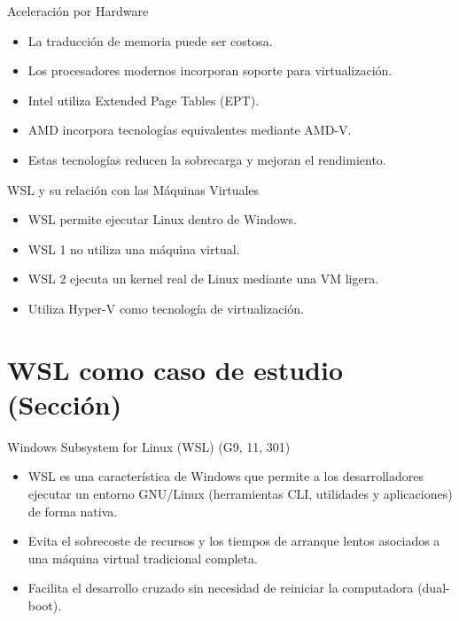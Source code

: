 \documentclass[presentation]{beamer}
\begin{document}
\begin{frame}[label={sec:org21f7b8d}]{Aceleración por Hardware}
\begin{itemize}
\item La traducción de memoria puede ser costosa.
\item Los procesadores modernos incorporan soporte para virtualización.
\item Intel utiliza Extended Page Tables (EPT).
\item AMD incorpora tecnologías equivalentes mediante AMD-V.
\item Estas tecnologías reducen la sobrecarga y mejoran el rendimiento.
\end{itemize}
\end{frame}

\begin{frame}[label={sec:org24cabca}]{WSL y su relación con las Máquinas Virtuales}
\begin{itemize}
\item WSL permite ejecutar Linux dentro de Windows.
\item WSL 1 no utiliza una máquina virtual.
\item WSL 2 ejecuta un kernel real de Linux mediante una VM ligera.
\item Utiliza Hyper-V como tecnología de virtualización.
\end{itemize}
\end{frame}

\section{WSL como caso de estudio (Sección)}
\label{sec:orgbffda99}

\begin{frame}[label={sec:org9b0ad8a}]{Windows Subsystem for Linux (WSL) (G9, 11, 301)}
\begin{itemize}
\item WSL es una característica de Windows que permite a los desarrolladores ejecutar un entorno GNU/Linux (herramientas CLI, utilidades y aplicaciones) de forma nativa.
\item Evita el sobrecoste de recursos y los tiempos de arranque lentos asociados a una máquina virtual tradicional completa.
\item Facilita el desarrollo cruzado sin necesidad de reiniciar la computadora (dual-boot).
\end{itemize}
\end{frame}
\end{document}
